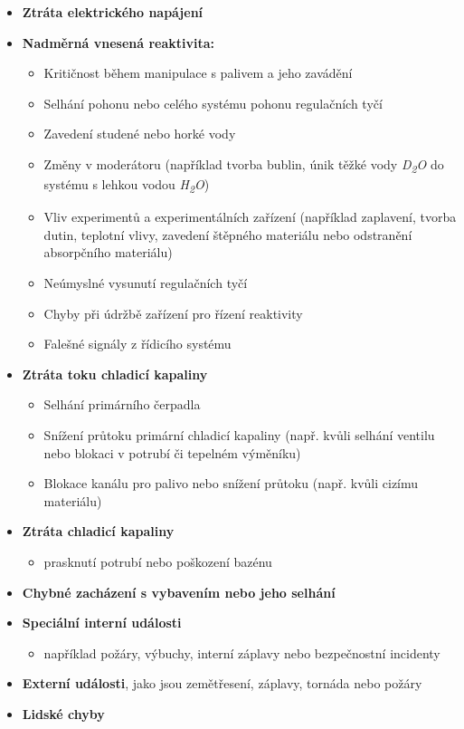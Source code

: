 \begin{itemize}
    \item \textbf{Ztráta elektrického napájení}
    \item \textbf{Nadměrná vnesená reaktivita:}
    \begin{itemize}
    \item Kritičnost během manipulace s palivem a jeho zavádění
    \item Selhání pohonu nebo celého systému pohonu regulačních tyčí
    \item Zavedení studené nebo horké vody
    \item Změny v moderátoru (například tvorba bublin, únik těžké vody \textit{D\textsubscript{2}O} do systému s lehkou vodou \textit{H\textsubscript{2}O})
    \item Vliv experimentů a experimentálních zařízení (například zaplavení, tvorba dutin, teplotní vlivy, zavedení štěpného materiálu nebo odstranění absorpčního materiálu)
    \item Neúmyslné vysunutí regulačních tyčí
    \item Chyby při údržbě zařízení pro řízení reaktivity
    \item Falešné signály z řídicího systému
\end{itemize}
    \item \textbf{Ztráta toku chladicí kapaliny}
    \begin{itemize}
    \item Selhání primárního čerpadla
    \item Snížení průtoku primární chladicí kapaliny (např. kvůli selhání ventilu nebo blokaci v potrubí či tepelném výměníku)
    \item Blokace kanálu pro palivo nebo snížení průtoku (např. kvůli cizímu materiálu)
\end{itemize}
    \item \textbf{Ztráta chladicí kapaliny}
    \begin{itemize}
        \item prasknutí potrubí nebo poškození bazénu
    \end{itemize}
    \item \textbf{Chybné zacházení s vybavením nebo jeho selhání}
    \item \textbf{Speciální interní události}
    \begin{itemize}
        \item například požáry, výbuchy, interní záplavy nebo bezpečnostní incidenty
    \end{itemize}
    \item \textbf{Externí události}, jako jsou zemětřesení, záplavy, tornáda nebo požáry
    \item \textbf{Lidské chyby}
\end{itemize}

